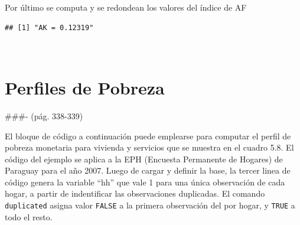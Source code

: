 \documentclass[
]{book}
\newenvironment{Shaded}{\begin{snugshade}}{\end{snugshade}}
\newcommand{\AttributeTok}[1]{\textcolor[rgb]{0.77,0.63,0.00}{#1}}
\newcommand{\ConstantTok}[1]{\textcolor[rgb]{0.00,0.00,0.00}{#1}}
\newcommand{\DecValTok}[1]{\textcolor[rgb]{0.00,0.00,0.81}{#1}}
\newcommand{\FunctionTok}[1]{\textcolor[rgb]{0.00,0.00,0.00}{#1}}
\newcommand{\NormalTok}[1]{#1}
\newcommand{\OtherTok}[1]{\textcolor[rgb]{0.56,0.35,0.01}{#1}}
\newcommand{\SpecialCharTok}[1]{\textcolor[rgb]{0.00,0.00,0.00}{#1}}
\newcommand{\StringTok}[1]{\textcolor[rgb]{0.31,0.60,0.02}{#1}}
\begin{document}
Por último se computa y se redondean los valores del índice de AF

\begin{Shaded}
\end{Shaded}

\begin{verbatim}
## [1] "AK = 0.12319"
\end{verbatim}

~

\hypertarget{perfiles-de-pobreza}{%
\section{Perfiles de Pobreza}\label{perfiles-de-pobreza}}

\#\#\#- (pág. 338-339)

El bloque de código a continuación puede emplearse para computar el perfil de pobreza monetaria para vivienda y servicios que se muestra en el cuadro 5.8. El código del ejemplo se aplica a la EPH (Encuesta Permanente de Hogares) de Paraguay para el año 2007. Luego de cargar y definir la base, la tercer linea de código genera la variable ``hh'' que vale 1 para una única observación de cada hogar, a partir de indentificar las observaciones duplicadas. El comando \texttt{duplicated} asigna valor \texttt{FALSE} a la primera observación del por hogar, y \texttt{TRUE} a todo el resto.

\begin{Shaded}
\end{Shaded}
\end{document}
